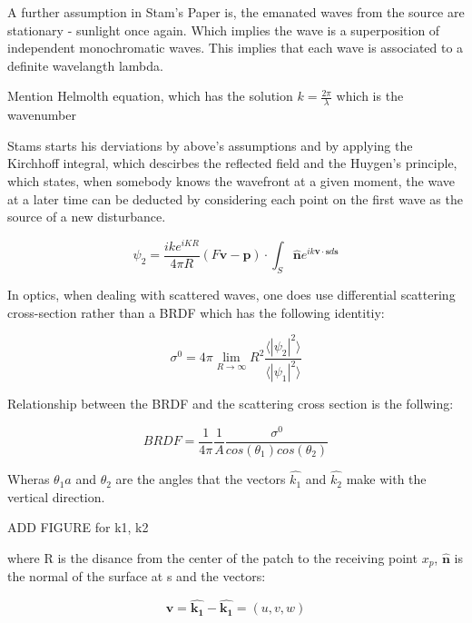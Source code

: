 A further assumption in Stam's Paper is, the emanated waves from the source are stationary - sunlight once again.
Which implies the wave is a superposition of independent monochromatic waves. This implies that each wave is associated to a definite wavelangth lambda.

Mention Helmolth equation, which has the solution $k = \frac{2\pi}{\lambda}$ which is the wavenumber

Stams starts his derviations by above's assumptions and by applying the Kirchhoff integral, which descirbes the reflected field and the Huygen's principle, which states, when somebody knows the wavefront at a given moment, the wave at a later time can be deducted by considering each point on the first wave as the source of a new disturbance.

\begin{equation}
  \psi_2 = \frac{i k e^{i K R}}{4 \pi R}(F\mathbf{v}-\mathbf{p}) \cdot \int_{S} \hat{\mathbf{n}} e^{ik\mathbf{v} \cdot \mathbf{s} d\mathbf{s}}
\end{equation}


In optics, when dealing with scattered waves, one does use differential scattering cross-section rather than a BRDF which has the following identitiy: 

\begin{equation}
    \sigma^0 = 4 \pi \lim_{R \to \infty} R^2 \frac{\langle \left|\psi_2\right|^2\rangle}{\langle \left|\psi_1\right|^2\rangle}
\end{equation}

Relationship between the BRDF and the scattering cross section is the follwing:

\begin{equation}
    BRDF = \frac{1}{4\pi}\frac{1}{A}\frac{\sigma^0}{cos(\theta_1)cos(\theta_2)}
\end{equation}

Wheras $\theta_1a$ and $\theta_2$ are the angles that the vectors $\hat{k_1}$
and $\hat{k_2}$ make with the vertical direction.
 
ADD FIGURE for k1, k2

where R is the disance from the center of the patch to the receiving point $x_p$, $\hat{\mathbf{n}}$ is the normal of the surface at s and the vectors:

\begin{equation*}
    \mathbf{v} = \hat{\mathbf{k_1}} - \hat{\mathbf{k_1}}
               = (u,v,w)
\end{equation*}

